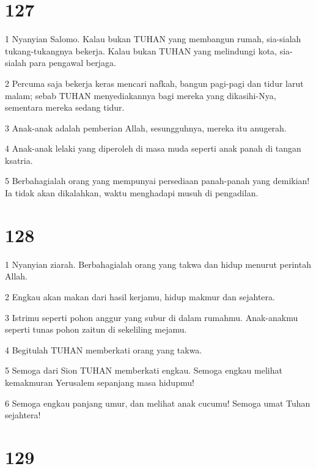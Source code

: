 \chapter{127}

\par 1 Nyanyian Salomo. Kalau bukan TUHAN yang membangun rumah, sia-sialah tukang-tukangnya bekerja. Kalau bukan TUHAN yang melindungi kota, sia-sialah para pengawal berjaga.
\par 2 Percuma saja bekerja keras mencari nafkah, bangun pagi-pagi dan tidur larut malam; sebab TUHAN menyediakannya bagi mereka yang dikasihi-Nya, sementara mereka sedang tidur.
\par 3 Anak-anak adalah pemberian Allah, sesungguhnya, mereka itu anugerah.
\par 4 Anak-anak lelaki yang diperoleh di masa muda seperti anak panah di tangan ksatria.
\par 5 Berbahagialah orang yang mempunyai persediaan panah-panah yang demikian! Ia tidak akan dikalahkan, waktu menghadapi musuh di pengadilan.

\chapter{128}

\par 1 Nyanyian ziarah. Berbahagialah orang yang takwa dan hidup menurut perintah Allah.
\par 2 Engkau akan makan dari hasil kerjamu, hidup makmur dan sejahtera.
\par 3 Istrimu seperti pohon anggur yang subur di dalam rumahmu. Anak-anakmu seperti tunas pohon zaitun di sekeliling mejamu.
\par 4 Begitulah TUHAN memberkati orang yang takwa.
\par 5 Semoga dari Sion TUHAN memberkati engkau. Semoga engkau melihat kemakmuran Yerusalem sepanjang masa hidupmu!
\par 6 Semoga engkau panjang umur, dan melihat anak cucumu! Semoga umat Tuhan sejahtera!

\chapter{129}

